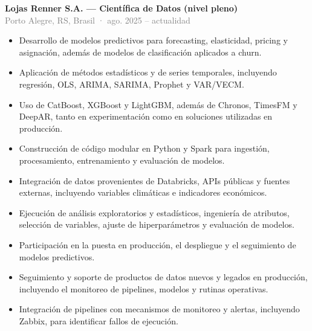 \documentclass[10pt,a4paper]{article}
\newcommand{\role}[3]{%
  \Needspace{13\baselineskip}%
  \textbf{#1}\\[-1pt]
  {\small\textcolor{grey}{#2}}\\[-1pt]
  #3\par}
\begin{document}
\role{Lojas Renner S.A. — Científica de Datos (nivel pleno)}{Porto Alegre, RS, Brasil · ago. 2025 – actualidad}{
\begin{itemize}
  \item Desarrollo de modelos predictivos para forecasting, elasticidad, pricing y asignación, además de modelos de clasificación aplicados a churn.
  \item Aplicación de métodos estadísticos y de series temporales, incluyendo regresión, OLS, ARIMA, SARIMA, Prophet y VAR/VECM.
  \item Uso de CatBoost, XGBoost y LightGBM, además de Chronos, TimesFM y DeepAR, tanto en experimentación como en soluciones utilizadas en producción.
  \item Construcción de código modular en Python y Spark para ingestión, procesamiento, entrenamiento y evaluación de modelos.
  \item Integración de datos provenientes de Databricks, APIs públicas y fuentes externas, incluyendo variables climáticas e indicadores económicos.
  \item Ejecución de análisis exploratorios y estadísticos, ingeniería de atributos, selección de variables, ajuste de hiperparámetros y evaluación de modelos.
  \item Participación en la puesta en producción, el despliegue y el seguimiento de modelos predictivos.
  \item Seguimiento y soporte de productos de datos nuevos y legados en producción, incluyendo el monitoreo de pipelines, modelos y rutinas operativas.
  \item Integración de pipelines con mecanismos de monitoreo y alertas, incluyendo Zabbix, para identificar fallos de ejecución.
\end{itemize}}
\end{document}

